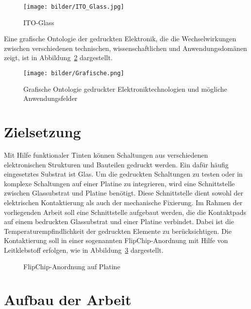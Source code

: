 \begin{figure}[H]
\begin{center}
\texttt{[image: bilder/ITO\_Glass.jpg]}
\end{center}
\caption{ITO-Glass}
\label{fig:1.2}
\end{figure}

Eine grafische Ontologie der gedruckten Elektronik, die die Wechselwirkungen zwischen verschiedenen technischen, wissenschaftlichen und Anwendungsdomänen zeigt, ist in Abbildung~\ref{fig:1.1} dargestellt.

\begin{figure}[H]
\begin{center}
\texttt{[image: bilder/Grafische.png]}
\end{center}
\caption{Grafische Ontologie gedruckter Elektroniktechnologien und mögliche Anwendungsfelder}
\label{fig:1.1}
\end{figure}

\section{Zielsetzung}
\label{sec:Zielsetzungs}
Mit Hilfe funktionaler Tinten können Schaltungen aus verschiedenen elektronischen Strukturen und Bauteilen gedruckt werden. Ein dafür häufig eingesetztes Substrat ist Glas. Um die gedruckten Schaltungen zu testen oder in komplexe Schaltungen auf einer Platine zu integrieren, wird eine Schnittstelle zwischen Glassubstrat und Platine benötigt. Diese Schnittstelle dient sowohl der elektrischen Kontaktierung als auch der mechanische Fixierung. Im Rahmen der vorliegenden Arbeit soll eine Schnittstelle aufgebaut werden, die die Kontaktpads auf einem bedruckten Glassubstrat und einer Platine verbindet. Dabei ist die Temperaturempfindlichkeit der gedruckten Elemente zu berücksichtigen. Die Kontaktierung soll in einer sogenannten FlipChip-Anordnung mit Hilfe von Leitklebstoff erfolgen, wie in Abbildung~\ref{FlipChip-Anordnung auf Platine} dargestellt.
\begin{figure}[H]
\begin{center} 
\caption{FlipChip-Anordnung auf Platine}
\label{FlipChip-Anordnung auf Platine}
\end{center}
\end{figure}

\section{Aufbau der Arbeit}
\label{sec:Aufbau der Arbeit}









